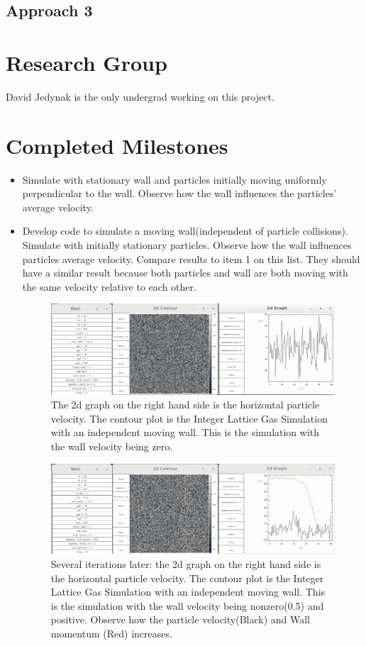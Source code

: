 \documentclass{article}
\begin{document}
\subsection{Approach 3}



\section{Research Group}
David Jedynak is the only undergrad working on this project.
\section{Completed Milestones}
\begin{itemize}
  \item Simulate with stationary wall and particles initially moving uniformly perpendicular to the wall. Observe how the wall influences the particles' average velocity.
 
    
  \item Develop code to simulate a moving wall(independent of particle collisions). Simulate with initially stationary particles. Observe how the wall influences particles average velocity. Compare results to item 1 on this list. They should have a similar result because both particles and wall are both moving with the same velocity relative to each other.
\begin{figure}

\includegraphics[scale=0.2]{ms1p0.png}
\caption{\label{fig} The 2d graph on the right hand side is the horizontal particle velocity. The contour plot is the Integer Lattice Gas Simulation with an independent moving wall. This is the simulation with the wall velocity being zero.}
\end{figure} 

\begin{figure}

\includegraphics[scale=0.2]{ms1p1.png}
\caption{\label{fig} Several iterations later: the 2d graph on the right hand side is the horizontal particle velocity. The contour plot is the Integer Lattice Gas Simulation with an independent moving wall. This is the simulation with the wall velocity being nonzero(0.5) and positive. Observe how the particle velocity(Black) and Wall momentum (Red) increases.}
\end{figure}


\end{itemize}
\end{document}
